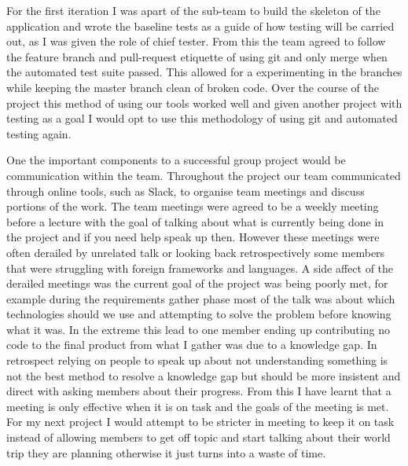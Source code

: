 \documentclass{style/CRPITStyle}
\begin{document}
\vspace{.1in}

For the first iteration I was apart of the sub-team to build the skeleton of the
application and wrote the baseline tests as a guide of how testing will be
carried out, as I was given the role of chief tester. From this the team agreed
to follow the feature branch and pull-request etiquette of using git and only
merge when the automated test suite passed. This allowed for a experimenting in the
branches while keeping the master branch clean of broken code.
Over the course of the project this method of using our tools worked well and
given another project with testing as a goal I would opt to use this
methodology of using git and automated testing again.

\vspace{.1in}

One the important components to a successful group project would be communication within the team.
Throughout the project our team communicated through online tools, such as
Slack, to organise team meetings and discuss portions of the work. The team
meetings were agreed to be a weekly meeting before a lecture with the goal of
talking about what is currently being done in the project and if you need help
speak up then. However these meetings were often derailed by unrelated talk or
looking back retrospectively some members that were struggling with foreign
frameworks and languages.
A side affect of the derailed meetings was the current goal of the project was
being poorly met, for example during the requirements gather phase most of the
talk was about which technologies should we use and attempting to solve the
problem before knowing what it was.
In the extreme this lead to one member ending up
contributing no code to the final product from what I gather was due to a
knowledge gap. In retrospect relying on people to speak up about not understanding
something is not the best method to resolve a knowledge gap but should be more
insistent and direct with asking members about their progress.
From this I have learnt that a meeting is only effective when it is on task and
the goals of the meeting is met. For my next project I would attempt to be
stricter in meeting to keep it on task instead of allowing members to get off topic
and start talking about their world trip they are planning otherwise it just
turns into a waste of time.

\vspace{.1in}
\end{document}
